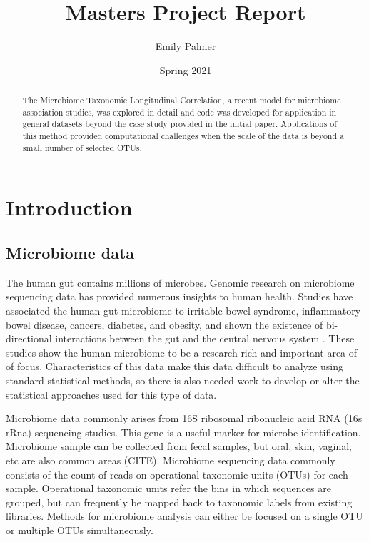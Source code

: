 \documentclass[12pt]{article}
\title{Masters Project Report}
\author{Emily Palmer}
\date{Spring 2021}
\begin{document}
\maketitle

\begin{abstract}
  The Microbiome Taxonomic Longitudinal Correlation, a recent model for microbiome association studies, was explored in detail and code was developed for application in general datasets beyond the case study provided in the initial paper. Applications of this method provided computational challenges when the scale of the data is beyond a small number of selected OTUs.
\end{abstract}




\section{Introduction}

\subsection{Microbiome data}
The human gut contains millions of microbes. Genomic research on microbiome sequencing data has provided numerous insights to human health. Studies have associated the human gut microbiome to irritable bowel syndrome, inflammatory bowel disease, cancers, diabetes, and obesity, and shown the existence of bi-directional interactions  between the gut and the central nervous system \cite{kinross2008human, mayer2015gut}. These studies show the human microbiome to be a research rich and important area of of focus. Characteristics of this data make this data difficult to analyze using standard statistical methods, so there is also needed work to develop or alter the statistical approaches used for this type of data.


Microbiome data commonly arises from 16S ribosomal ribonucleic acid RNA (16s rRna) sequencing studies. This gene is a useful marker for microbe identification. Microbiome sample can be collected from fecal samples, but oral, skin, vaginal, etc are also common areas (CITE). Microbiome sequencing data commonly consists of the count of reads on operational taxonomic units (OTUs) for each sample. Operational taxonomic units refer the bins in which sequences are grouped, but can frequently be mapped back to taxonomic labels from existing libraries. Methods for microbiome analysis can either be focused on a single OTU or multiple OTUs simultaneously.
\end{document}
